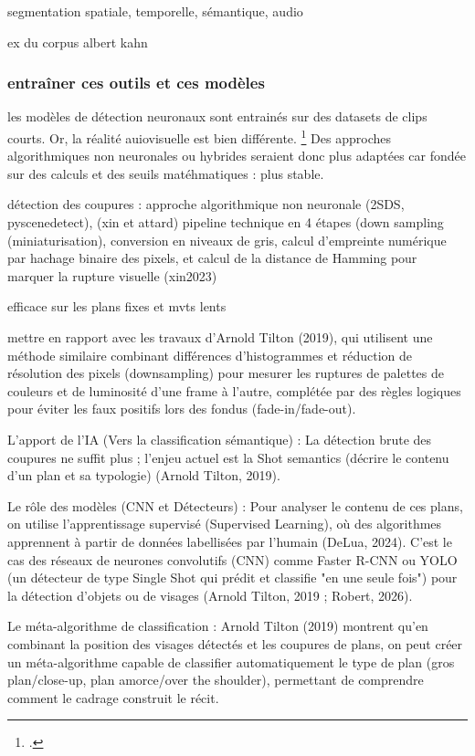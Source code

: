 segmentation spatiale, temporelle, sémantique, audio

ex du corpus albert kahn 

\subsubsection{entraîner ces outils et ces modèles}

les modèles de détection neuronaux sont entrainés sur des datasets de clips courts. Or, la réalité auiovisuelle est bien différente. \footcite{pattichis2023} Des approches algorithmiques non neuronales ou hybrides seraient donc plus adaptées car fondée sur des calculs et des seuils matéhmatiques : plus stable. 

détection des coupures : 
approche algorithmique non neuronale (2SDS, pyscenedetect), (xin et attard) pipeline technique en 4 étapes (down sampling (miniaturisation), conversion en niveaux de gris, calcul d'empreinte numérique par hachage binaire des pixels, et calcul de la distance de Hamming pour marquer la rupture visuelle (xin2023)

efficace sur les plans fixes et mvts lents 

mettre en rapport avec les travaux d'Arnold  Tilton (2019), qui utilisent une méthode similaire combinant différences d'histogrammes et réduction de résolution des pixels (downsampling) pour mesurer les ruptures de palettes de couleurs et de luminosité d'une frame à l'autre, complétée par des règles logiques pour éviter les faux positifs lors des fondus (fade-in/fade-out).

L'apport de l'IA (Vers la classification sémantique) : La détection brute des coupures ne suffit plus ; l'enjeu actuel est la Shot semantics (décrire le contenu d'un plan et sa typologie) (Arnold  Tilton, 2019).

Le rôle des modèles (CNN et Détecteurs) : Pour analyser le contenu de ces plans, on utilise l'apprentissage supervisé (Supervised Learning), où des algorithmes apprennent à partir de données labellisées par l'humain (DeLua, 2024). C'est le cas des réseaux de neurones convolutifs (CNN) comme Faster R-CNN ou YOLO (un détecteur de type Single Shot qui prédit et classifie "en une seule fois") pour la détection d'objets ou de visages (Arnold  Tilton, 2019 ; Robert, 2026).

Le méta-algorithme de classification : Arnold  Tilton (2019) montrent qu'en combinant la position des visages détectés et les coupures de plans, on peut créer un méta-algorithme capable de classifier automatiquement le type de plan (gros plan/close-up, plan amorce/over the shoulder), permettant de comprendre comment le cadrage construit le récit.

